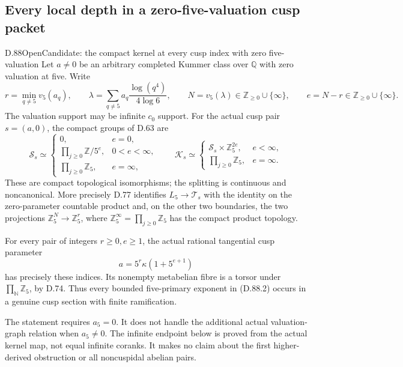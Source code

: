 \subsection{Every local depth in a zero-five-valuation cusp packet}

\begin{statement}{D.88}{Open}{Candidate: the compact kernel at every cusp index with zero five-valuation}
Let \(a\ne0\) be an arbitrary completed Kummer class over
\(\mathbb Q\) with zero valuation at five. Write
\[
 r=\min_{q\ne5}v_5(a_q),\qquad
 \lambda=\sum_{q\ne5}a_q\frac{\log(q^4)}{4\log6},
 \qquad N=v_5(\lambda)\in\mathbb Z_{\ge0}\cup\{\infty\},
 \qquad e=N-r\in\mathbb Z_{\ge0}\cup\{\infty\}.                                    \tag{D.88.1}
\]
The valuation support may be infinite \(c_0\) support. For the
actual cusp pair \(s=(a,0)\), the compact groups of D.63 are
\[
 \mathcal S_s\simeq
 \begin{cases}
  0,&e=0,\\
  \displaystyle\prod_{j\ge0}\mathbb Z/5^e,&0<e<\infty,\\
  \displaystyle\prod_{j\ge0}\mathbb Z_5,&e=\infty,
 \end{cases}
 \qquad
 \mathcal K_s\simeq
 \begin{cases}
  \mathcal S_s\times\mathbb Z_5^{2e},&e<\infty,\\
  \displaystyle\prod_{j\ge0}\mathbb Z_5,&e=\infty.
 \end{cases}
                                                               \tag{D.88.2}
\]
These are compact topological isomorphisms; the splitting is
continuous and noncanonical. More precisely D.77 identifies
\(L_5\to\mathcal T_s\) with the identity on the zero-parameter
countable product and, on the other two boundaries, the two
projections \(\mathbb Z_5^N\to\mathbb Z_5^r\),
where \(\mathbb Z_5^\infty=\prod_{j\ge0}\mathbb Z_5\)
has the compact product topology.

For every pair of integers \(r\ge0,e\ge1\), the actual rational tangential
cusp parameter
\[
                    a=5^r\kappa(1+5^{e+1})             \tag{D.88.3}
\]
has precisely these indices. Its nonempty metabelian fibre is
a torsor under \(\prod_{\mathbb N}\mathbb Z_5\), by D.74.
Thus every bounded five-primary exponent in (D.88.2) occurs
in a genuine cusp section with finite ramification.

The statement requires \(a_5=0\).
It does not handle the additional actual valuation-graph
relation when \(a_5\ne0\). The infinite endpoint below
is proved from the actual kernel map, not equal infinite coranks. It makes no claim about the first
higher-derived obstruction or all noncuspidal abelian pairs.
\end{statement}

